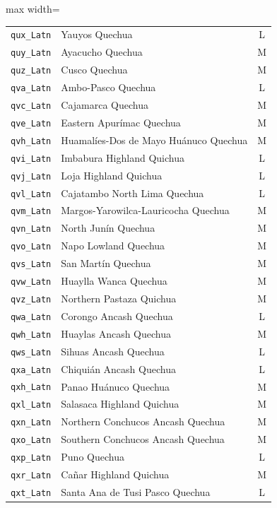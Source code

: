 {\begin{adjustbox}{max width=\textwidth}
\begin{tabular}{llc}
        \texttt{qux\_Latn} & Yauyos Quechua & L \\
        \texttt{quy\_Latn} & Ayacucho Quechua & M \\
        \texttt{quz\_Latn} & Cusco Quechua & M \\
        \texttt{qva\_Latn} & Ambo-Pasco Quechua & L \\
        \texttt{qvc\_Latn} & Cajamarca Quechua & M \\
        \texttt{qve\_Latn} & Eastern Apurímac Quechua & M \\
        \texttt{qvh\_Latn} & Huamalíes-Dos de Mayo Huánuco Quechua & M \\
        \texttt{qvi\_Latn} & Imbabura Highland Quichua & L \\
        \texttt{qvj\_Latn} & Loja Highland Quichua & L \\
        \texttt{qvl\_Latn} & Cajatambo North Lima Quechua & L \\
        \texttt{qvm\_Latn} & Margos-Yarowilca-Lauricocha Quechua & M \\
        \texttt{qvn\_Latn} & North Junín Quechua & M \\
        \texttt{qvo\_Latn} & Napo Lowland Quechua & M \\
        \texttt{qvs\_Latn} & San Martín Quechua & M \\
        \texttt{qvw\_Latn} & Huaylla Wanca Quechua & M \\
        \texttt{qvz\_Latn} & Northern Pastaza Quichua & M \\
        \texttt{qwa\_Latn} & Corongo Ancash Quechua & L \\
        \texttt{qwh\_Latn} & Huaylas Ancash Quechua & M \\
        \texttt{qws\_Latn} & Sihuas Ancash Quechua & L \\
        \texttt{qxa\_Latn} & Chiquián Ancash Quechua & L \\
        \texttt{qxh\_Latn} & Panao Huánuco Quechua & M \\
        \texttt{qxl\_Latn} & Salasaca Highland Quichua & M \\
        \texttt{qxn\_Latn} & Northern Conchucos Ancash Quechua & M \\
        \texttt{qxo\_Latn} & Southern Conchucos Ancash Quechua & M \\
        \texttt{qxp\_Latn} & Puno Quechua & L \\
        \texttt{qxr\_Latn} & Cañar Highland Quichua & M \\
        \texttt{qxt\_Latn} & Santa Ana de Tusi Pasco Quechua & L \\

\end{tabular}
\end{adjustbox}}
